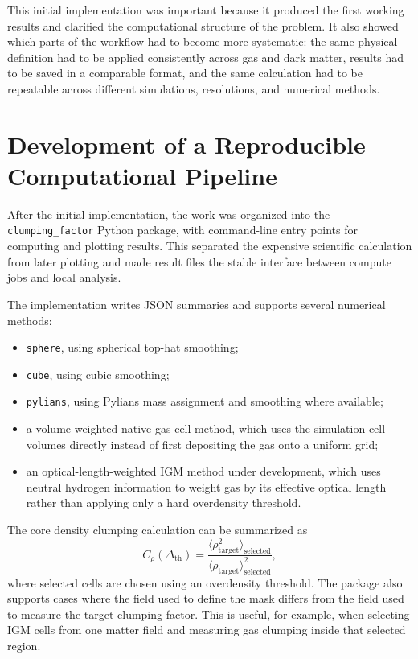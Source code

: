 \documentclass[
    aps,
    prd,
    preprint,
    onecolumn,
    nofootinbib,
    groupedaddress
]{revtex4-2}
\begin{document}
This initial implementation was important because it produced the first working results and clarified the computational structure of the problem. It also showed which parts of the workflow had to become more systematic: the same physical definition had to be applied consistently across gas and dark matter, results had to be saved in a comparable format, and the same calculation had to be repeatable across different simulations, resolutions, and numerical methods.

\section{Development of a Reproducible Computational Pipeline}

After the initial implementation, the work was organized into the \texttt{clumping\_factor} Python package, with command-line entry points for computing and plotting results. This separated the expensive scientific calculation from later plotting and made result files the stable interface between compute jobs and local analysis.

The implementation writes JSON summaries and supports several numerical methods:
\begin{itemize}
    \item \texttt{sphere}, using spherical top-hat smoothing;
    \item \texttt{cube}, using cubic smoothing;
    \item \texttt{pylians}, using Pylians mass assignment and smoothing where available;
    \item a volume-weighted native gas-cell method, which uses the simulation cell volumes directly instead of first depositing the gas onto a uniform grid;
    \item an optical-length-weighted IGM method under development, which uses neutral hydrogen information to weight gas by its effective optical length rather than applying only a hard overdensity threshold.
\end{itemize}
The core density clumping calculation can be summarized as
\begin{equation}
    C_\rho(\Delta_{\mathrm{th}}) =
    \frac{\langle \rho_{\mathrm{target}}^2 \rangle_{\mathrm{selected}}}
    {\langle \rho_{\mathrm{target}} \rangle_{\mathrm{selected}}^2},
\end{equation}
where selected cells are chosen using an overdensity threshold. The package also supports cases where the field used to define the mask differs from the field used to measure the target clumping factor. This is useful, for example, when selecting IGM cells from one matter field and measuring gas clumping inside that selected region.
\end{document}

